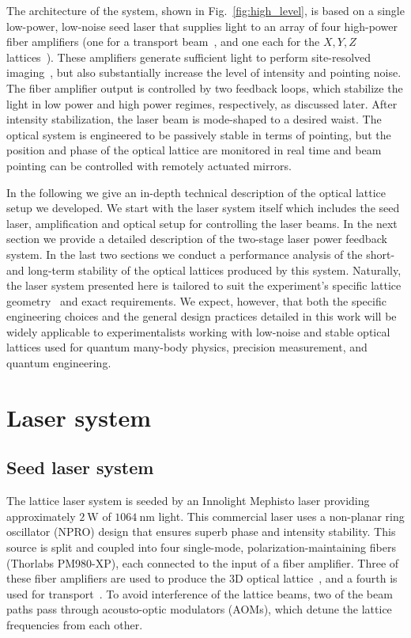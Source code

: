 \documentclass[twocolumn,aip,rsi,reprint,bibnotes]{revtex4-1}
\newcommand\unit[2]{\ensuremath{#1~\mathrm{{#2}}}}
\begin{document}
The architecture of the system, shown in Fig.~\ref{fig:high_level}, is based on a single low-power, low-noise seed laser that supplies light to an array of four high-power fiber amplifiers (one for a transport beam~\cite{Huber2014}, and one each for the $X,Y,Z$ lattices~\cite{Blatt2015,Parsons2016}).
These amplifiers generate sufficient light to perform site-resolved imaging~\cite{Parsons2015}, but also substantially increase the level of intensity and pointing noise.
The fiber amplifier output is controlled by two feedback loops, which stabilize the light in low power and high power regimes, respectively, as discussed later.
After intensity stabilization, the laser beam is mode-shaped to a desired waist.
The optical system is engineered to be passively stable in terms of pointing, but the position and phase of the optical lattice are monitored in real time and beam pointing can be controlled with remotely actuated mirrors.

In the following we give an in-depth technical description of the optical lattice setup we developed. We start with the laser system itself which includes the seed laser, amplification and optical setup for controlling the laser beams. In the next section we provide a detailed description of the two-stage laser power feedback system. In the last two sections we conduct a performance analysis of the short- and long-term stability of the optical lattices produced by this system.
Naturally, the laser system presented here is tailored to suit the experiment's specific lattice geometry~\cite{Huber2014} and exact requirements.
We expect, however, that both the specific engineering choices and the general design practices detailed in this work will be widely applicable to experimentalists working with low-noise and stable optical lattices used for quantum many-body physics, precision measurement, and quantum engineering.

\section{Laser system}
\subsection{Seed laser system}
The lattice laser system is seeded by an Innolight Mephisto laser providing approximately \unit{2}{W} of \unit{1064}{nm} light.
This commercial laser uses a non-planar ring oscillator (NPRO) design that ensures superb phase and intensity stability.
This source is split and coupled into four single-mode, polarization-maintaining fibers (Thorlabs PM980-XP), each connected to the input of a fiber amplifier.
Three of these fiber amplifiers are used to produce the 3D optical lattice~\cite{Blatt2015,Parsons2016}, and a fourth is used for transport~\cite{Huber2014}.
To avoid interference of the lattice beams, two of the beam paths pass through acousto-optic modulators (AOMs), which detune the lattice frequencies from each other.
\end{document}
